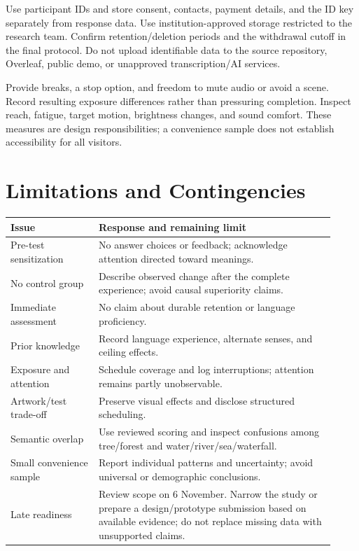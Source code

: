 \documentclass[11pt,letterpaper]{article}
\begin{document}
Use participant IDs and store consent, contacts, payment details, and the ID key separately from response data. Use institution-approved storage restricted to the research team. Confirm retention/deletion periods and the withdrawal cutoff in the final protocol. Do not upload identifiable data to the source repository, Overleaf, public demo, or unapproved transcription/AI services.

Provide breaks, a stop option, and freedom to mute audio or avoid a scene. Record resulting exposure differences rather than pressuring completion. Inspect reach, fatigue, target motion, brightness changes, and sound comfort. These measures are design responsibilities; a convenience sample does not establish accessibility for all visitors.

\section{Limitations and Contingencies}
\begin{longtable}{p{0.25\linewidth}p{0.67\linewidth}}
\toprule Issue & Response and remaining limit \\
\midrule\endhead
Pre-test sensitization & No answer choices or feedback; acknowledge attention directed toward meanings. \\
No control group & Describe observed change after the complete experience; avoid causal superiority claims. \\
Immediate assessment & No claim about durable retention or language proficiency. \\
Prior knowledge & Record language experience, alternate senses, and ceiling effects. \\
Exposure and attention & Schedule coverage and log interruptions; attention remains partly unobservable. \\
Artwork/test trade-off & Preserve visual effects and disclose structured scheduling. \\
Semantic overlap & Use reviewed scoring and inspect confusions among tree/forest and water/river/sea/waterfall. \\
Small convenience sample & Report individual patterns and uncertainty; avoid universal or demographic conclusions. \\
Late readiness & Review scope on 6 November. Narrow the study or prepare a design/prototype submission based on available evidence; do not replace missing data with unsupported claims. \\
\bottomrule
\end{longtable}
\end{document}
